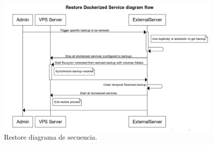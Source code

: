\begin{figure}[!htb]
\begin{center}
\includegraphics[width=1\textwidth]{./figuras/restore_diagram}
\caption{Restore diagrama de secuencia.}
\label{F:restore_diagram}
\end{center}
\end{figure}
